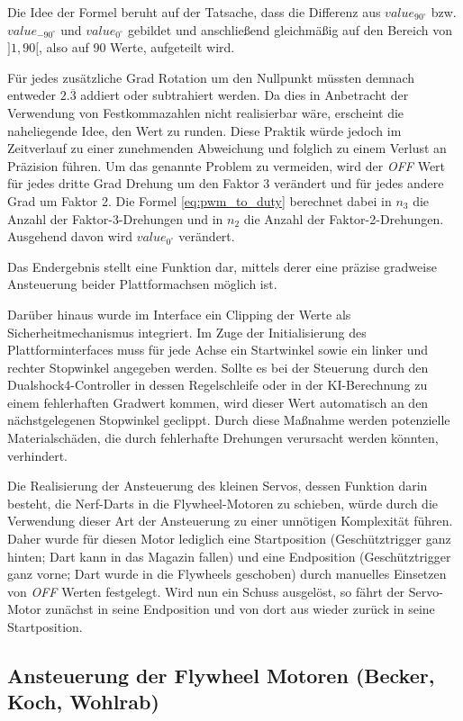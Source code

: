 Die Idee der Formel beruht auf der Tatsache, dass die Differenz aus $value_{90^\circ}$ bzw. $value_{-90^\circ}$ und $value_{0^\circ}$ gebildet und anschließend gleichmäßig auf den Bereich von $]1, 90[$, also auf 90 Werte, aufgeteilt wird. 

Für jedes zusätzliche Grad Rotation um den Nullpunkt müssten demnach entweder $2.\overline{3}$ addiert oder subtrahiert werden.
Da dies in Anbetracht der Verwendung von Festkommazahlen nicht realisierbar wäre, erscheint die naheliegende Idee, den Wert zu runden. 
Diese Praktik würde jedoch im Zeitverlauf zu einer zunehmenden Abweichung und folglich zu einem Verlust an Präzision führen.
Um das genannte Problem zu vermeiden, wird der \textit{OFF} Wert für jedes dritte Grad Drehung um den Faktor 3 verändert und für jedes andere Grad um Faktor 2.
Die Formel \ref{eq:pwm_to_duty} berechnet dabei in $n_3$ die Anzahl der Faktor-3-Drehungen und in $n_2$ die Anzahl der Faktor-2-Drehungen.
Ausgehend davon wird $value_{0^\circ}$ verändert.

Das Endergebnis stellt eine Funktion dar, mittels derer eine präzise gradweise Ansteuerung beider Plattformachsen möglich ist.

Darüber hinaus wurde im Interface ein Clipping der Werte als Sicherheitmechanismus integriert. Im Zuge der Initialisierung des Plattforminterfaces muss für jede Achse ein Startwinkel sowie ein linker und rechter Stopwinkel angegeben werden.
Sollte es bei der Steuerung durch den Dualshock4-Controller in dessen Regelschleife oder in der KI-Berechnung zu einem fehlerhaften Gradwert kommen, wird dieser Wert automatisch an den nächstgelegenen Stopwinkel geclippt. 
Durch diese Maßnahme werden potenzielle Materialschäden, die durch fehlerhafte Drehungen verursacht werden könnten, verhindert.

Die Realisierung der Ansteuerung des kleinen Servos, dessen Funktion darin besteht, die Nerf-Darts in die Flywheel-Motoren zu schieben, würde durch die Verwendung dieser Art der Ansteuerung zu einer unnötigen Komplexität führen.
Daher wurde für diesen Motor lediglich eine Startposition (Geschütztrigger ganz hinten; Dart kann in das Magazin fallen) und eine Endposition (Geschütztrigger ganz vorne; Dart wurde in die Flywheels geschoben) durch manuelles Einsetzen von \textit{OFF} Werten festgelegt.
Wird nun ein Schuss ausgelöst, so fährt der Servo-Motor zunächst in seine Endposition und von dort aus wieder zurück in seine Startposition.

\subsection{Ansteuerung der Flywheel Motoren (Becker, Koch, Wohlrab)}

